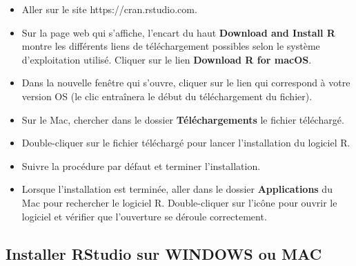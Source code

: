 \documentclass[
  letterpaper,
]{book}
\providecommand{\tightlist}{%
  \setlength{\itemsep}{0pt}\setlength{\parskip}{0pt}}\usepackage{longtable,booktabs,array}
\begin{document}
\begin{itemize}
\tightlist
\item
  Aller sur le site https://cran.rstudio.com.
\item
  Sur la page web qui s'affiche, l'encart du haut \textbf{Download and
  Install R} montre les différents liens de téléchargement possibles
  selon le système d'exploitation utilisé. Cliquer sur le lien
  \textbf{Download R for macOS}.
\item
  Dans la nouvelle fenêtre qui s'ouvre, cliquer sur le lien qui
  correspond à votre version OS (le clic entraînera le début du
  téléchargement du fichier).
\item
  Sur le Mac, chercher dans le dossier \textbf{Téléchargements} le
  fichier téléchargé.
\item
  Double-cliquer sur le fichier téléchargé pour lancer l'installation du
  logiciel R.
\item
  Suivre la procédure par défaut et terminer l'installation.
\item
  Lorsque l'installation est terminée, aller dans le dossier
  \textbf{Applications} du Mac pour rechercher le logiciel R.
  Double-cliquer sur l'icône pour ouvrir le logiciel et vérifier que
  l'ouverture se déroule correctement.
\end{itemize}

\subsection{Installer RStudio sur WINDOWS ou
MAC}\label{installer-rstudio-sur-windows-ou-mac}
\end{document}
